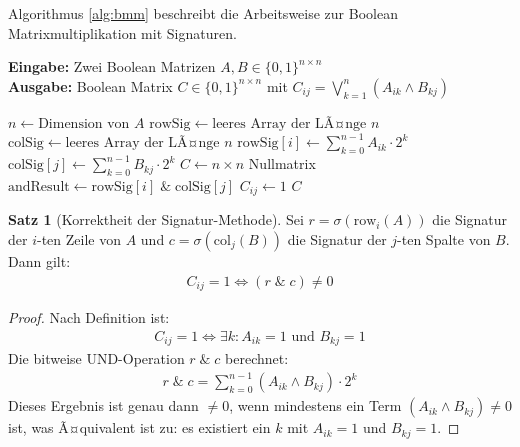﻿\documentclass[a4paper,12pt]{article}
\theoremstyle{definition}
\newtheorem{satz}{Satz}
\begin{document}
Algorithmus \ref{alg:bmm} beschreibt die Arbeitsweise zur Boolean Matrixmultiplikation mit Signaturen.

\begin{algorithm}[htb]
	\caption{Boolean Matrixmultiplikation mit Signaturen}
	\label{alg:bmm}
	\textbf{Eingabe:} Zwei Boolean Matrizen $A, B \in \{0,1\}^{n \times n}$ \\
	\textbf{Ausgabe:} Boolean Matrix $C \in \{0,1\}^{n \times n}$ mit $C_{ij} = \bigvee_{k=1}^{n} (A_{ik} \wedge B_{kj})$
	\begin{algorithmic}[1]
		\State $n \gets \text{Dimension von } A$
		\State $\text{rowSig} \gets \text{leeres Array der LÃ¤nge } n$
		\State $\text{colSig} \gets \text{leeres Array der LÃ¤nge } n$
		\State $\text{rowSig}[i] \gets \sum_{k=0}^{n-1} A_{ik} \cdot 2^k$ 
		\EndFor
		\State $\text{colSig}[j] \gets \sum_{k=0}^{n-1} B_{kj} \cdot 2^k$ 
		\EndFor
		\State $C \gets n \times n$ Nullmatrix
		\State $\text{andResult} \gets \text{rowSig}[i] \; \& \; \text{colSig}[j]$ 
		\State $C_{ij} \gets 1$
		\EndIf
		\EndFor
		\EndFor    
		\State \Return $C$
	\end{algorithmic}
\end{algorithm}

\begin{satz}[Korrektheit der Signatur-Methode]
	Sei $r = \sigma(\text{row}_i(A))$ die Signatur der $i$-ten Zeile von $A$ und $c = \sigma(\text{col}_j(B))$ die Signatur der $j$-ten Spalte von $B$. Dann gilt:
	\begin{align}
		C_{ij} = 1 \Leftrightarrow (r \; \& \; c) \neq 0
	\end{align}
\end{satz}

\begin{proof}
	Nach Definition ist:
	\begin{align}
		C_{ij} = 1 \Leftrightarrow \exists k: A_{ik} = 1 \text{ und } B_{kj} = 1
	\end{align}
	Die bitweise UND-Operation $r \; \& \; c$ berechnet:
	\begin{align}
		r \; \& \; c = \sum_{k=0}^{n-1} (A_{ik} \wedge B_{kj}) \cdot 2^k
	\end{align}
	Dieses Ergebnis ist genau dann $\neq 0$, wenn mindestens ein Term $(A_{ik} \wedge B_{kj}) \neq 0$ ist, was Ã¤quivalent ist zu: es existiert ein $k$ mit $A_{ik} = 1$ und $B_{kj} = 1$.
\end{proof}
\end{document}
